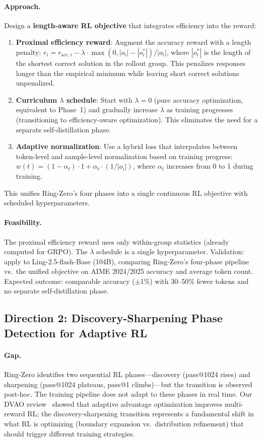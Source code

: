 \documentclass[11pt,a4paper]{article}
\begin{document}
\paragraph{Approach.} Design a \textbf{length-aware RL objective} that integrates efficiency into the reward:
\begin{enumerate}
\item \textbf{Proximal efficiency reward}: Augment the accuracy reward with a length penalty: $r_i = r_{\mathrm{acc},i} - \lambda \cdot \max(0, |o_i| - |o_i^*|) / |o_i|$, where $|o_i^*|$ is the length of the shortest correct solution in the rollout group. This penalizes responses longer than the empirical minimum while leaving short correct solutions unpenalized.
\item \textbf{Curriculum $\lambda$ schedule}: Start with $\lambda = 0$ (pure accuracy optimization, equivalent to Phase~1) and gradually increase $\lambda$ as training progresses (transitioning to efficiency-aware optimization). This eliminates the need for a separate self-distillation phase.
\item \textbf{Adaptive normalization}: Use a hybrid loss that interpolates between token-level and sample-level normalization based on training progress: $w(t) = (1 - \alpha_t) \cdot 1 + \alpha_t \cdot (1/|o_i|)$, where $\alpha_t$ increases from 0 to 1 during training.
\end{enumerate}
This unifies Ring-Zero's four phases into a single continuous RL objective with scheduled hyperparameters.

\paragraph{Feasibility.} The proximal efficiency reward uses only within-group statistics (already computed for GRPO). The $\lambda$ schedule is a single hyperparameter. Validation: apply to Ling-2.5-flash-Base (104B), comparing Ring-Zero's four-phase pipeline vs.\ the unified objective on AIME 2024/2025 accuracy and average token count. Expected outcome: comparable accuracy ($\pm$1\%) with 30--50\% fewer tokens and no separate self-distillation phase.

\subsection{Direction 2: Discovery-Sharpening Phase Detection for Adaptive RL}

\paragraph{Gap.} Ring-Zero identifies two sequential RL phases---discovery (pass@1024 rises) and sharpening (pass@1024 plateaus, pass@1 climbs)---but the transition is observed post-hoc. The training pipeline does not adapt to these phases in real time. Our DVAO review~\cite{dvao2026} showed that adaptive advantage optimization improves multi-reward RL; the discovery-sharpening transition represents a fundamental shift in what RL is optimizing (boundary expansion vs.\ distribution refinement) that should trigger different training strategies.
\end{document}
